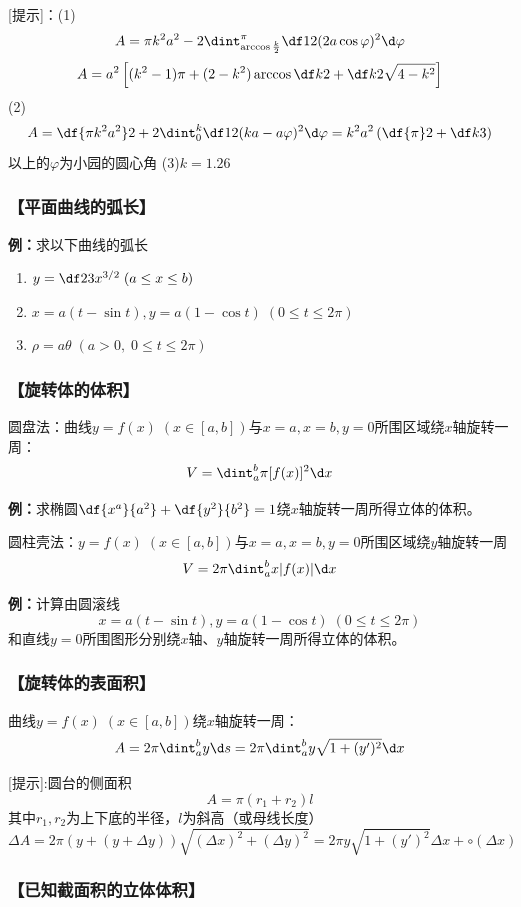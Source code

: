 [提示]：(1)
$$A=\pi k^2a^2-2\dint_{\arccos\frac k2}^{\pi}\df12(2a\cos\varphi)^2
\d\varphi$$
$$A=a^2\left[(k^2-1)\pi+(2-k^2)\arccos\df k2+\df k2
\sqrt{4-k^2}\right]$$
(2)
$$A=\df{\pi k^2a^2}2+2\dint_0^k\df12(ka-a\varphi)^2\d\varphi=k^2a^2
\left(\df{\pi}2+\df k3\right)$$
以上的$\varphi$为小园的圆心角
(3)$k=1.26$

\subsubsection{【平面曲线的弧长】}

{\bf 例：}求以下曲线的弧长 
\begin{enumerate}[(1)]
  \setlength{\itemindent}{1cm}
  \item $y=\df 23x^{3/2}\;(a\leq x\leq b)$ 
  \item $x=a(t-\sin t),y=a(1-\cos t)\;(0\leq t\leq 2\pi)$ 
  \item $\rho=a\theta\;(a>0,\;0\leq t\leq 2\pi)$
\end{enumerate}

\subsubsection{【旋转体的体积】}

圆盘法：曲线$y=f(x)\;(x\in[a,b])$与$x=a,x=b,y=0$所围区域绕$x$轴旋转一周：
$$V=\dint_a^b\pi[f(x)]^2\d x$$

{\bf 例：}求椭圆$\df{x^a}{a^2}+\df{y^2}{b^2}=1$绕$x$轴旋转一周所得立体的体积。

圆柱壳法：$y=f(x)\;(x\in[a,b])$与$x=a,x=b,y=0$所围区域绕$y$轴旋转一周
$$V=2\pi\dint_a^bx|f(x)|\d x$$

{\bf 例：}计算由圆滚线$$x=a(t-\sin t),y=a(1-\cos t)\;(0\leq t\leq 2\pi)$$
和直线$y=0$所围图形分别绕$x$轴、$y$轴旋转一周所得立体的体积。

\subsubsection{【旋转体的表面积】}
曲线$y=f(x)\;(x\in[a,b])$绕$x$轴旋转一周：
$$A=2\pi \dint_a^by\d s=2\pi \dint_a^by\sqrt{1+(y')^2}\d x$$

[提示]:圆台的侧面积
$$A=\pi(r_1+r_2)l$$
其中$r_1,r_2$为上下底的半径，$l$为斜高（或母线长度）
$$\Delta A=2\pi(y+(y+\Delta y))\sqrt{(\Delta x)^2+(\Delta y)^2}
=2\pi y\sqrt{1+(y')^2}\Delta x+\circ(\Delta x)$$

\subsubsection{【已知截面积的立体体积】}

